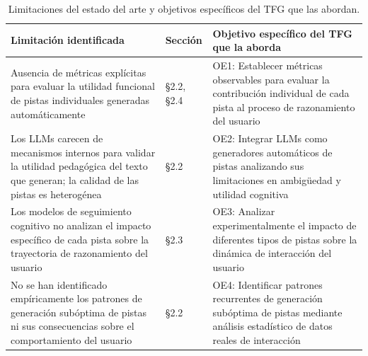 \documentclass[../main.tex]{subfiles}
\begin{document}
\begin{table}[H]
\centering
\begin{tabular}{p{5.5cm}p{2.5cm}p{5.5cm}}
\hline
\textbf{Limitación identificada} & \textbf{Sección} & \textbf{Objetivo específico del TFG que la aborda} \\
\hline
Ausencia de métricas explícitas para evaluar la utilidad funcional de pistas individuales generadas automáticamente & §2.2, §2.4 & OE1: Establecer métricas observables para evaluar la contribución individual de cada pista al proceso de razonamiento del usuario \\
\hline
Los LLMs carecen de mecanismos internos para validar la utilidad pedagógica del texto que generan; la calidad de las pistas es heterogénea & §2.2 & OE2: Integrar LLMs como generadores automáticos de pistas analizando sus limitaciones en ambigüedad y utilidad cognitiva \\
\hline
Los modelos de seguimiento cognitivo no analizan el impacto específico de cada pista sobre la trayectoria de razonamiento del usuario & §2.3 & OE3: Analizar experimentalmente el impacto de diferentes tipos de pistas sobre la dinámica de interacción del usuario \\
\hline
No se han identificado empíricamente los patrones de generación subóptima de pistas ni sus consecuencias sobre el comportamiento del usuario & §2.2 & OE4: Identificar patrones recurrentes de generación subóptima de pistas mediante análisis estadístico de datos reales de interacción \\
\hline
\end{tabular}
\caption{Limitaciones del estado del arte y objetivos específicos del TFG que las abordan.}
\label{tab:limitaciones_objetivos}
\end{table}
\end{document}
